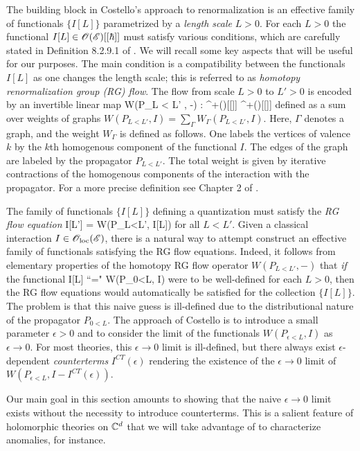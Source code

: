 \documentclass[10pt]{amsart}
\begin{document}
The building block in Costello's approach to renormalization is an effective family of functionals $\{I[L]\}$ parametrized by a {\em length scale} $L > 0$. 
For each $L > 0$ the functional $I[L] \in \mathscr O(\mathscr E)[[\hbar]]$ must satisfy various conditions, which are carefully stated in Definition 8.2.9.1 of \cite{CG2}. 
We will recall some key aspects that will be useful for our purposes. 
The main condition is a compatibility between the functionals $I[L]$ as one changes the length scale; this is referred to as {\em homotopy renormalization group (RG) flow}.
The flow from scale $L>0$ to $L'>0$ is encoded by an invertible linear map
\ben
W(P_{L < L'} , -) : \sO^+(\sE)[[\hbar]] \to \sO^+(\sE)[[\hbar]]
\een
defined as a sum over weights of graphs $W (P_{L<L'}, I) = \sum_{\Gamma} W_{\Gamma}(P_{L<L'}, I)$. 
Here, $\Gamma$ denotes a graph, and the weight $W_\Gamma$ is defined as follows.
One labels the vertices of valence $k$ by the $k$th homogenous component of the functional $I$. 
The edges of the graph are labeled by the propagator $P_{L<L'}$.
The total weight is given by iterative contractions of the homogenous components of the interaction with the propagator. 
For a more precise definition see Chapter 2 of \cite{CosRenorm}.

The family of functionals $\{I[L]\}$ defining a quantization must satisfy the {\em RG flow equation}
\ben
I[L'] = W(P_{L<L'}, I[L])
\een
for all $L < L'$. 
Given a classical interaction $I \in {\mathscr O}_{\rm loc}(\mathscr E)$, there is a natural way to attempt construct an effective family of functionals satisfying the RG flow equations.
Indeed, it follows from elementary properties of the homotopy RG flow operator $W(P_{L < L'}, -)$ that {\em if} the functional
\ben
I[L] \;\; ``=" \;\; W(P_{0<L}, I) 
\een
were to be well-defined for each $L >0$, then the RG flow equations would automatically be satisfied for the collection $\{I[L]\}$. 
The problem is that this naive guess is ill-defined due to the distributional nature of the propagator $P_{0<L}$. 
The approach of Costello is to introduce a small parameter $\epsilon > 0$ and to consider the limit of the functionals $W(P_{\epsilon < L}, I)$ as $\epsilon \to 0$. 
For most theories, this $\epsilon \to 0$ limit is ill-defined, but there always exist $\epsilon$-dependent {\em counterterms} $I^{CT}(\epsilon)$ rendering the existence of the $\epsilon \to 0$ limit of $W(P_{\epsilon < L}, I - I^{CT}(\epsilon))$. 

Our main goal in this section amounts to showing that the naive $\epsilon \to 0$ limit exists without the necessity to introduce counterterms. 
This is a salient feature of holomorphic theories on $\mathbb C^d$ that we will take advantage of to characterize anomalies, for instance. 
\end{document}
